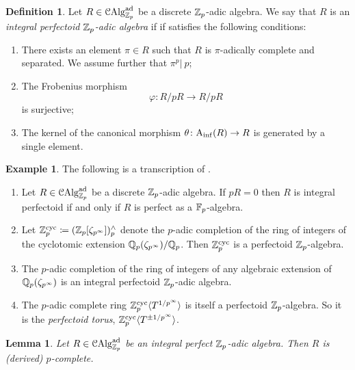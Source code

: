 \documentclass[10pt,a4paper]{amsart}
\numberwithin{equation}{subsection}
\newtheorem{lemma}[theorem]{Lemma}
\theoremstyle{definition}
\newtheorem{example}[theorem]{Example}
\newtheorem{definition}[theorem]{Definition}
\begin{document}
\begin{definition}
    Let $R \in \mathcal C \mathrm{Alg}^{\mathrm{ad}}_{\mathbb Z_p}$ be a discrete $\mathbb Z_p$-adic algebra. We say that $R$ is an \emph{integral perfectoid $\mathbb Z_p$-adic algebra} if if satisfies the following conditions:
        \begin{enumerate}
                \item There exists an element $\pi \in R$ such that $R$ is $\pi$-adically complete and separated. We assume further that $\pi^p \vert \ p$;
                \item The Frobenius morphism    
                        \[
                                \varphi \colon R/p R \to R/ pR
                        \]  
                  is surjective;
            \item The kernel of the canonical morphism $\theta \colon \mathrm{A}_{\mathrm{inf}}(R) \to R$ is generated by a single element.
        \end{enumerate}
\end{definition}

\begin{example} The following is a transcription of \cite[Example 3.6]{bhatt2018integral}.
    \begin{enumerate}
        \item Let $R \in \mathcal C \mathrm{Alg}^{\mathrm{ad}}_{\mathbb Z_p}$ be a discrete $\mathbb Z_p$-adic algebra. If $pR =0 $ then $R$ is integral perfectoid if and only if $R$ is perfect as a $\mathbb F_p$-algebra.
        \item Let $\mathbb Z_p^{\mathrm{cyc}} \coloneqq (\mathbb Z_p[\zeta_{p^\infty}])^\wedge_p$ denote the $p$-adic completion of the ring of integers of the cyclotomic extension $\mathbb Q_p(\zeta_{p^\infty}) / \mathbb Q_p$. Then $\mathbb Z_p^{\mathrm{cyc}}$ is a perfectoid $\mathbb Z_p$-algebra.
        \item The $p$-adic completion of the ring of integers of any algebraic extension of $\mathbb Q_p(\zeta_{p^\infty})$ is an integral perfectoid $\mathbb Z_p$-adic algebra.
        \item The $p$-adic complete ring $\mathbb Z_p^{\mathrm{cyc}} \langle T^{1/p^\infty} \rangle$ is itself a perfectoid $\mathbb Z_p$-algebra. So it is the \emph{perfectoid torus}, $\mathbb Z_p^{\mathrm{cyc}} \langle T^{\pm 1/p^\infty} \rangle$.
    \end{enumerate}
\end{example}

\begin{lemma}
    Let $R \in \mathcal C \mathrm{Alg}^{\mathrm{ad}}_{\mathbb Z_p}$ be an integral perfect $\mathbb Z_p$-adic algebra. Then $R$ is (derived) $p$-complete.
\end{lemma}
\end{document}
